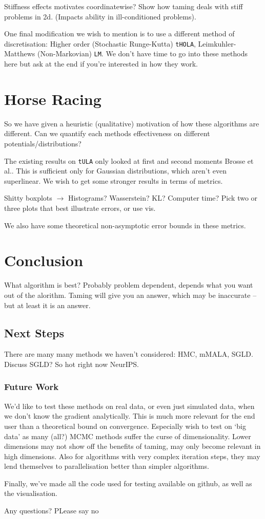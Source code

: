 \documentclass[a4paper]{article}
\begin{document}
Stiffness effects motivates coordinatewise? Show how taming deals with stiff problems in 2d. (Impacts ability in ill-conditioned problems).

One final modification we wish to mention is to use a different method of discretisation: Higher order (Stochastic Runge-Kutta) \texttt{tHOLA}, Leimkuhler-Matthews (Non-Markovian) \texttt{LM}. We don't have time to go into these methods here but ask at the end if you're interested in how they work.
\section{Horse Racing}
So we have given a heuristic (qualitative) motivation of how these algorithms are different. Can we quantify each methods effectiveness on different potentials/distributions? 

The existing results on \texttt{tULA} only looked at first and second moments Brosse et al.. This is sufficient only for Gaussian distributions, which aren't even superlinear. We wish to get some stronger results in terms of metrics. 

Shitty boxplots \(\longrightarrow\) Histograms? Wasserstein? KL? Computer time? Pick two or three plots that best illustrate errors, or use vis.

We also have some theoretical non-asymptotic error bounds in these metrics. 

\section{Conclusion}
What algorithm is best? Probably problem dependent, depends what you want out of the alorithm. Taming will give you an answer, which may be inaccurate -- but at least it is an answer. 
\subsection*{Next Steps}
There are many many methods we haven't considered: HMC, mMALA, SGLD. Discuss SGLD? So hot right now NeurIPS. 
\subsubsection*{Future Work}
We'd like to test these methods on real data, or even just simulated data, when we don't know the gradient analytically. This is much more relevant for the end user than a theoretical bound on convergence. Especially wish to test on `big data' as many (all?) MCMC methods suffer the curse of dimensionality. Lower dimensions may not show off the benefits of taming, may only become relevant in high dimensions. Also for algorithms with very complex iteration steps, they may lend themselves to parallelisation  better than simpler algorithms.

Finally, we've made all the code used for testing available on github, as well as the visualisation. 

\begin{center}Any questions? PLease say no\end{center}
\end{document}
